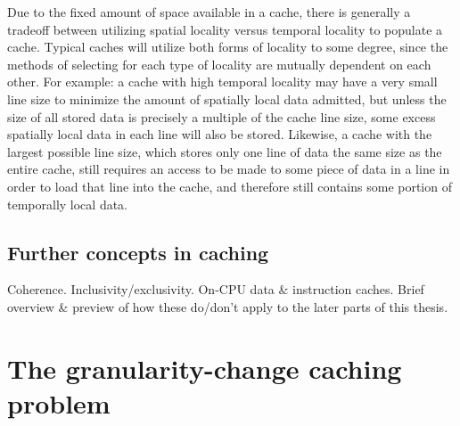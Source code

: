 \documentclass[12pt,twoside]{reedthesis}
\begin{document}
	Due to the fixed amount of space available in a cache, there is generally a tradeoff between utilizing spatial locality versus temporal locality to populate a cache. Typical caches will utilize both forms of locality to some degree, since the methods of selecting for each type of locality are mutually dependent on each other. For example: a cache with high temporal locality may have a very small line size to minimize the amount of spatially local data admitted, but unless the size of all stored data is precisely a multiple of the cache line size, some excess spatially local data in each line will also be stored. Likewise, a cache with the largest possible line size, which stores only one line of data the same size as the entire cache, still requires an access to be made to some piece of data in a line in order to load that line into the cache, and therefore still contains some portion of temporally local data.

	\subsection*{Further concepts in caching}

	Coherence. Inclusivity/exclusivity. On-CPU data \& instruction caches. Brief overview \& preview of how these do/don't apply to the later parts of this thesis.



\section{The granularity-change caching problem}
\end{document}

